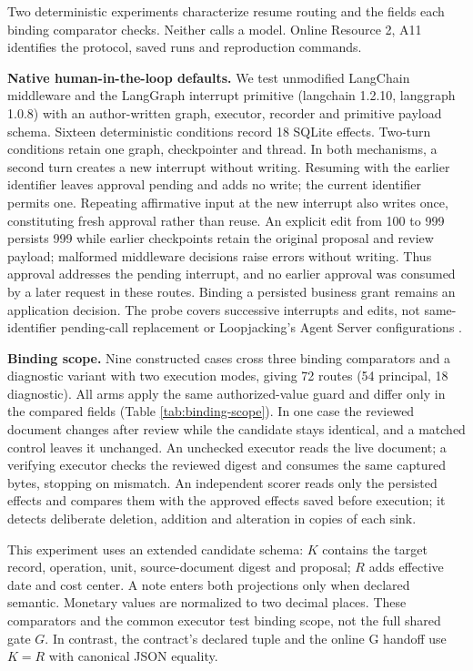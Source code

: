 Two deterministic experiments characterize resume routing and the fields each binding comparator checks. Neither calls a model. Online Resource 2, A11 identifies the protocol, saved runs and reproduction commands.

\textbf{Native human-in-the-loop defaults.} We test unmodified LangChain middleware \citep{langchain-hitl} and the LangGraph interrupt primitive (langchain 1.2.10, langgraph 1.0.8) with an author-written graph, executor, recorder and primitive payload schema. Sixteen deterministic conditions record 18 SQLite effects. Two-turn conditions retain one graph, checkpointer and thread. In both mechanisms, a second turn creates a new interrupt without writing. Resuming with the earlier identifier leaves approval pending and adds no write; the current identifier permits one. Repeating affirmative input at the new interrupt also writes once, constituting fresh approval rather than reuse. An explicit edit from 100 to 999 persists 999 while earlier checkpoints retain the original proposal and review payload; malformed middleware decisions raise errors without writing. Thus approval addresses the pending interrupt, and no earlier approval was consumed by a later request in these routes. Binding a persisted business grant remains an application decision. The probe covers successive interrupts and edits, not same-identifier pending-call replacement or Loopjacking's Agent Server configurations \citep{kumar2026loopjacking}.

\textbf{Binding scope.} Nine constructed cases cross three binding comparators and a diagnostic variant with two execution modes, giving 72 routes (54 principal, 18 diagnostic). All arms apply the same authorized-value guard and differ only in the compared fields (Table \ref{tab:binding-scope}). In one case the reviewed document changes after review while the candidate stays identical, and a matched control leaves it unchanged. An unchecked executor reads the live document; a verifying executor checks the reviewed digest and consumes the same captured bytes, stopping on mismatch. An independent scorer reads only the persisted effects and compares them with the approved effects saved before execution; it detects deliberate deletion, addition and alteration in copies of each sink.

This experiment uses an extended candidate schema: $K$ contains the target record, operation, unit, source-document digest and proposal; $R$ adds effective date and cost center. A note enters both projections only when declared semantic. Monetary values are normalized to two decimal places. These comparators and the common executor test binding scope, not the full shared gate $G$. In contrast, the contract's declared tuple and the online G handoff use $K=R$ with canonical JSON equality.

